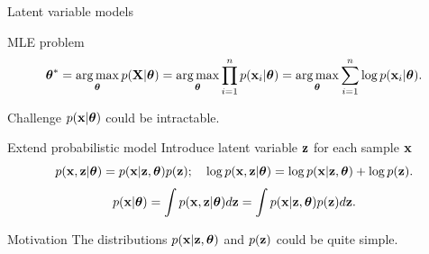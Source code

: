 \begin{frame}{Latent variable models}
    \begin{block}{MLE problem}
    \vspace{-0.5cm}
    \[
        \boldsymbol{\theta}^* = \operatorname*{arg\,max}_{\boldsymbol{\theta}} p(\mathbf{X} | \boldsymbol{\theta}) = \operatorname*{arg\,max}_{\boldsymbol{\theta}} \prod_{i=1}^n p(\mathbf{x}_i | \boldsymbol{\theta}) = \operatorname*{arg\,max}_{\boldsymbol{\theta}} \sum_{i=1}^n \log p(\mathbf{x}_i | \boldsymbol{\theta}).
    \]
    \vspace{-0.5cm}
    \end{block}
    \begin{block}{Challenge}
    $p(\mathbf{x} | \boldsymbol{\theta})$ could be intractable.
    \end{block}
    \begin{block}{Extend probabilistic model}
    Introduce latent variable $\mathbf{z}$ for each sample $\mathbf{x}$
    \[
        p(\mathbf{x}, \mathbf{z} | \boldsymbol{\theta}) = p(\mathbf{x} | \mathbf{z}, \boldsymbol{\theta}) p(\mathbf{z}); \quad 
        \log p(\mathbf{x}, \mathbf{z} | \boldsymbol{\theta}) = \log p(\mathbf{x} | \mathbf{z}, \boldsymbol{\theta}) + \log p(\mathbf{z}).
    \]
    \[
        p(\mathbf{x} | \boldsymbol{\theta}) = \int p(\mathbf{x}, \mathbf{z} | \boldsymbol{\theta}) d\mathbf{z} = \int p(\mathbf{x} | \mathbf{z}, \boldsymbol{\theta}) p(\mathbf{z}) d\mathbf{z}.
    \]
    \end{block}
	\vspace{-0.3cm}
	\begin{block}{Motivation}
		The distributions $p(\mathbf{x} | \mathbf{z}, \boldsymbol{\theta})$ and $p(\mathbf{z})$ could be quite simple.
	\end{block}
\end{frame}
